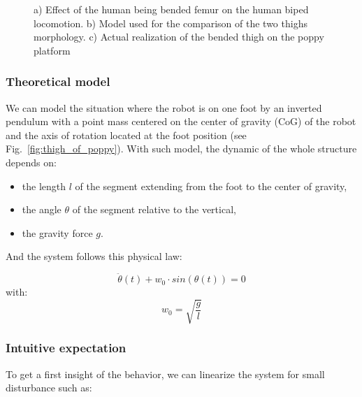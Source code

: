 \begin{figure}
\centering
    \hfil
    \hfil
    \caption{ a) Effect of the human being bended femur on the human biped locomotion.
    b) Model used for the comparison of the two thighs morphology.
    c) Actual realization of the bended thigh on the poppy platform}
    \label{fig:poppy_thigh}
\end{figure}

\subsubsection{Theoretical model} %
\label{sub:exp_theoritical_model}

We can model the situation where the robot is on one foot by an inverted pendulum with a point mass centered on the center of gravity (CoG) of the robot and the axis of rotation located at the foot position (see Fig.~\ref{fig:thigh_of_poppy}). With such model, the dynamic of the whole structure depends on:

\begin{itemize}
    \item the length $l$ of the segment extending from the foot to the center of gravity,
    \item the angle $\theta$ of the segment relative to the vertical,
    \item the gravity force $g$.
\end{itemize}

And the system follows this physical law:

\begin{equation}
    \ddot{\theta}(t) + w_0 \cdot sin(\theta(t)) = 0
\end{equation}
with:
\begin{equation}
    w_0 = \sqrt{\frac{g}{l}}
\end{equation}

\subsubsection{Intuitive expectation} %

To get a first insight of the behavior, we can linearize the system for small disturbance such as:

